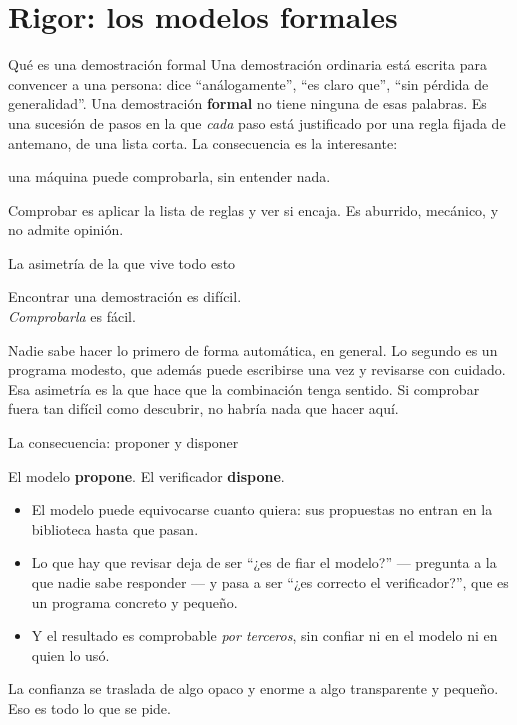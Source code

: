 \documentclass[11pt,aspectratio=169]{beamer}
\begin{document}
\section{Rigor: los modelos formales}

\begin{frame}{Qué es una demostración formal}
  Una demostración ordinaria está escrita para convencer a una persona: dice
  ``análogamente'', ``es claro que'', ``sin pérdida de generalidad''.
  \vfill
  Una demostración \textbf{formal} no tiene ninguna de esas palabras. Es una
  sucesión de pasos en la que \emph{cada} paso está justificado por una regla
  fijada de antemano, de una lista corta.
  \vfill
  La consecuencia es la interesante:
  \begin{center}
    \large
    una máquina puede comprobarla, sin entender nada.
  \end{center}
  \vfill
  Comprobar es aplicar la lista de reglas y ver si encaja. Es aburrido,
  mecánico, y no admite opinión.
\end{frame}

\begin{frame}{La asimetría de la que vive todo esto}
  \begin{center}
    \Large
    Encontrar una demostración es difícil.\\[1ex]
    \emph{Comprobarla} es fácil.
  \end{center}
  \vfill
  Nadie sabe hacer lo primero de forma automática, en general. Lo segundo es
  un programa modesto, que además puede escribirse una vez y revisarse con
  cuidado.
  \vfill
  Esa asimetría es la que hace que la combinación tenga sentido. Si comprobar
  fuera tan difícil como descubrir, no habría nada que hacer aquí.
\end{frame}

\begin{frame}{La consecuencia: proponer y disponer}
  \begin{center}
    \large
    El modelo \textbf{propone}. \qquad El verificador \textbf{dispone}.
  \end{center}
  \vfill
  \begin{itemize}
    \item El modelo puede equivocarse cuanto quiera: sus propuestas no entran
          en la biblioteca hasta que pasan.
    \item Lo que hay que revisar deja de ser ``¿es de fiar el modelo?'' ---
          pregunta a la que nadie sabe responder --- y pasa a ser
          ``¿es correcto el verificador?'', que es un programa concreto y
          pequeño.
    \item Y el resultado es comprobable \emph{por terceros}, sin confiar ni en
          el modelo ni en quien lo usó.
  \end{itemize}
  \vfill
  La confianza se traslada de algo opaco y enorme a algo transparente y
  pequeño. Eso es todo lo que se pide.
\end{frame}
\end{document}
